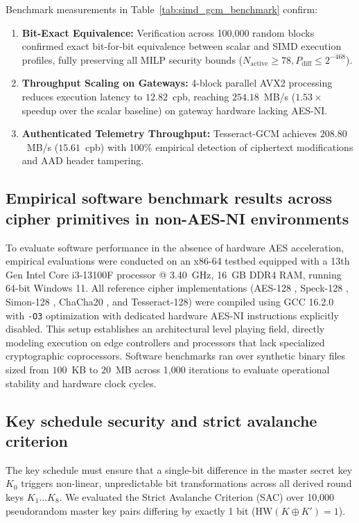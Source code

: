\documentclass[review,12pt]{elsarticle}
\begin{document}
Benchmark measurements in Table~\ref{tab:simd_gcm_benchmark} confirm:
\begin{enumerate}
    \item \textbf{Bit-Exact Equivalence:} Verification across 100,000 random blocks confirmed exact bit-for-bit equivalence between scalar and SIMD execution profiles, fully preserving all MILP security bounds ($N_{\text{active}} \ge 78, P_{\text{diff}} \le 2^{-468}$).
    \item \textbf{Throughput Scaling on Gateways:} 4-block parallel AVX2 processing reduces execution latency to $12.82$~cpb, reaching $254.18$~MB/s ($1.53\times$ speedup over the scalar baseline) on gateway hardware lacking AES-NI.
    \item \textbf{Authenticated Telemetry Throughput:} Tesseract-GCM achieves $208.80$~MB/s ($15.61$~cpb) with 100\% empirical detection of ciphertext modifications and AAD header tampering.
\end{enumerate}


\subsection{Empirical software benchmark results across cipher primitives in non-AES-NI environments}
\label{sec:experiments}

To evaluate software performance in the absence of hardware AES acceleration, empirical evaluations were conducted on an x86-64 testbed equipped with a 13th Gen Intel Core i3-13100F processor @ 3.40~GHz, 16~GB DDR4 RAM, running 64-bit Windows 11. All reference cipher implementations (AES-128 \cite{nist2001fips}, Speck-128 \cite{beaulieu2015simon}, Simon-128 \cite{beaulieu2015simon}, ChaCha20 \cite{nir2018chacha20}, and Tesseract-128) were compiled using GCC 16.2.0 with \texttt{-O3} optimization with dedicated hardware AES-NI instructions explicitly disabled. This setup establishes an architectural level playing field, directly modeling execution on edge controllers and processors that lack specialized cryptographic coprocessors. Software benchmarks ran over synthetic binary files sized from $100$~KB to $20$~MB across 1,000 iterations to evaluate operational stability and hardware clock cycles.

\subsection{Key schedule security and strict avalanche criterion}
\label{subsec:key_schedule_sac}
The key schedule must ensure that a single-bit difference in the master secret key $K_0$ triggers non-linear, unpredictable bit transformations across all derived round keys $K_1 \dots K_8$. We evaluated the Strict Avalanche Criterion (SAC) \cite{webster1985sac} over 10,000 pseudorandom master key pairs differing by exactly 1 bit ($\text{HW}(K \oplus K') = 1$). 
\end{document}
